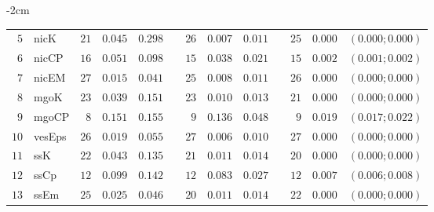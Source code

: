 \begin{table*}[!htbp]
\begin{adjustwidth*}{}{-2cm}
\begin{tabular}{@{}rlrrrrrrrrrcc@{}}
\footnotesize{$5 $} & \footnotesize{nicK     } & \footnotesize{$21$} & \footnotesize{$0.045$} & \footnotesize{$0.298$} && \footnotesize{$26$} & \footnotesize{$0.007$} & \footnotesize{$0.011$} && \footnotesize{$25$} & \footnotesize{$0.000$} & \footnotesize{$(0.000;0.000)$} \\
\footnotesize{$6 $} & \footnotesize{nicCP    } & \footnotesize{$16$} & \footnotesize{$0.051$} & \footnotesize{$0.098$} && \footnotesize{$15$} & \footnotesize{$0.038$} & \footnotesize{$0.021$} && \footnotesize{$15$} & \footnotesize{$0.002$} & \footnotesize{$(0.001;0.002)$} \\
\footnotesize{$7 $} & \footnotesize{nicEM    } & \footnotesize{$27$} & \footnotesize{$0.015$} & \footnotesize{$0.041$} && \footnotesize{$25$} & \footnotesize{$0.008$} & \footnotesize{$0.011$} && \footnotesize{$26$} & \footnotesize{$0.000$} & \footnotesize{$(0.000;0.000)$} \\
\footnotesize{$8 $} & \footnotesize{mgoK     } & \footnotesize{$23$} & \footnotesize{$0.039$} & \footnotesize{$0.151$} && \footnotesize{$23$} & \footnotesize{$0.010$} & \footnotesize{$0.013$} && \footnotesize{$21$} & \footnotesize{$0.000$} & \footnotesize{$(0.000;0.000)$} \\
\footnotesize{$9 $} & \footnotesize{mgoCP    } & \footnotesize{$8 $} & \footnotesize{$0.151$} & \footnotesize{$0.155$} && \footnotesize{$9 $} & \footnotesize{$0.136$} & \footnotesize{$0.048$} && \footnotesize{$9 $} & \footnotesize{$0.019$} & \footnotesize{$(0.017;0.022)$} \\
\footnotesize{$10$} & \footnotesize{vesEps   } & \footnotesize{$26$} & \footnotesize{$0.019$} & \footnotesize{$0.055$} && \footnotesize{$27$} & \footnotesize{$0.006$} & \footnotesize{$0.010$} && \footnotesize{$27$} & \footnotesize{$0.000$} & \footnotesize{$(0.000;0.000)$} \\
\footnotesize{$11$} & \footnotesize{ssK      } & \footnotesize{$22$} & \footnotesize{$0.043$} & \footnotesize{$0.135$} && \footnotesize{$21$} & \footnotesize{$0.011$} & \footnotesize{$0.014$} && \footnotesize{$20$} & \footnotesize{$0.000$} & \footnotesize{$(0.000;0.000)$} \\
\footnotesize{$12$} & \footnotesize{ssCp     } & \footnotesize{$12$} & \footnotesize{$0.099$} & \footnotesize{$0.142$} && \footnotesize{$12$} & \footnotesize{$0.083$} & \footnotesize{$0.027$} && \footnotesize{$12$} & \footnotesize{$0.007$} & \footnotesize{$(0.006;0.008)$} \\
\footnotesize{$13$} & \footnotesize{ssEm     } & \footnotesize{$25$} & \footnotesize{$0.025$} & \footnotesize{$0.046$} && \footnotesize{$20$} & \footnotesize{$0.011$} & \footnotesize{$0.014$} && \footnotesize{$22$} & \footnotesize{$0.000$} & \footnotesize{$(0.000;0.000)$} \\

\end{tabular}
\end{adjustwidth*}
\end{table*}
